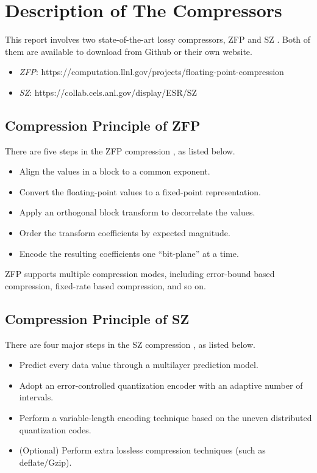 \section{Description of The Compressors}

This report involves two state-of-the-art lossy compressors, ZFP \cite{lindstrom} and SZ \cite{di,tao}.
Both of them are available to download from Github or their own website. 
\begin{itemize}
\item \emph{ZFP}: https://computation.llnl.gov/projects/floating-point-compression
\item \emph{SZ}: https://collab.cels.anl.gov/display/ESR/SZ
\end{itemize}

\subsection{Compression Principle of ZFP}

There are five steps in the ZFP compression \cite{lindstrom}, as listed below.
\begin{itemize}
\item Align the values in a block to a common exponent. 
\item Convert the floating-point values to a fixed-point representation.
\item Apply an orthogonal block transform to decorrelate the values.
\item Order the transform coefficients by expected magnitude.
\item Encode the resulting coefficients one ``bit-plane'' at a time.
\end{itemize}

ZFP supports multiple compression modes, including error-bound based compression, fixed-rate based compression, and so on. 

\subsection{Compression Principle of SZ}

There are four major steps in the SZ compression \cite{di,tao}, as listed below.
\begin{itemize}
\item Predict every data value through a multilayer prediction model.
\item Adopt an error-controlled quantization encoder with an adaptive number of intervals.
\item Perform a variable-length encoding technique based on the uneven distributed quantization codes.
\item (Optional) Perform extra lossless compression techniques (such as deflate/Gzip).
\end{itemize}

